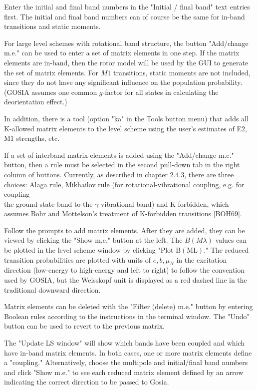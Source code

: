 \documentclass[10pt]{article}
\begin{document}
Enter the initial and final band numbers in the "Initial / final band" text entries first. The initial and final band numbers can of course be the same for in-band transitions and static moments.

For large level schemes with rotational band structure, the button "Add/change m.e." can be used to enter a set of matrix elements in one step. If the matrix elements are in-band, then the rotor model will be used by the GUI to generate the set of matrix elements. For $M 1$ transitions, static moments are not included, since they do not have any significant influence on the population probability. (GOSIA assumes one common $g$-factor for all states in calculating the deorientation effect.)

In addition, there is a tool (option "ka" in the Tools button menu) that adds all K-allowed matrix elements to the level scheme using the user's estimates of E2, M1 strengths, etc.

If a set of interband matrix elements is added using the "Add/change m.e." button, then a rule must be selected in the second pull-down tab in the right column of buttons. Currently, as described in chapter 2.4.3, there are three choices: Alaga rule, Mikhailov rule (for rotational-vibrational coupling, e.g. for coupling\\
the ground-state band to the $\gamma$-vibrational band) and K-forbidden, which assumes Bohr and Mottelson's treatment of K-forbidden transitions [BOH69].

Follow the prompts to add matrix elements. After they are added, they can be viewed by clicking the "Show m.e." button at the left. The $B(M \lambda)$ values can be plotted in the level scheme window by clicking "Plot $\mathrm{B}(\mathrm{ML})$." The reduced transition probabilities are plotted with units of $e, b, \mu_{N}$ in the excitation direction (low-energy to high-energy and left to right) to follow the convention used by GOSIA, but the Weisskopf unit is displayed as a red dashed line in the traditional downward direction.

Matrix elements can be deleted with the "Filter (delete) m.e." button by entering Boolean rules according to the instructions in the terminal window. The "Undo" button can be used to revert to the previous matrix.

The "Update LS window" will show which bands have been coupled and which have in-band matrix elements. In both cases, one or more matrix elements define a "coupling." Alternatively, choose the multipole and initial/final band numbers and click "Show m.e." to see each reduced matrix element defined by an arrow indicating the correct direction to be passed to Gosia.
\end{document}
